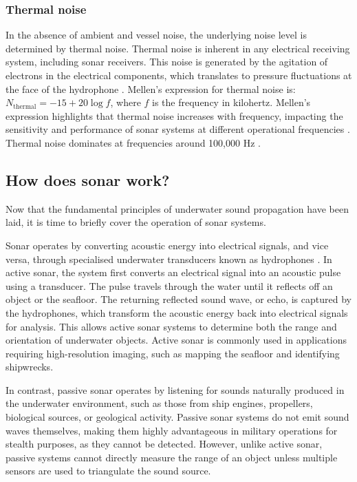 \subsubsection{Thermal noise}
    In the absence of ambient and vessel noise, the underlying noise level is determined by thermal noise. Thermal noise is inherent in any electrical receiving system, including sonar receivers. This noise is generated by the agitation of electrons in the electrical components, which translates to pressure fluctuations at the face of the hydrophone \cite{waite_sonar_2002}. Mellen's expression for thermal noise is: $N_\text{thermal} = -15 + 20 \log f$, where $f$ is the frequency in kilohertz. Mellen's expression highlights that thermal noise increases with frequency, impacting the sensitivity and performance of sonar systems at different operational frequencies \cite{bjorno_applied_2017}. Thermal noise dominates at frequencies around 100,000 Hz \cite{dahl_underwater_2007}.

\subsection{How does sonar work?}\label{subsec:sonar-working}

Now that the fundamental principles of underwater sound propagation have been laid, it is time to briefly cover the operation of sonar systems.

Sonar operates by converting acoustic energy into electrical signals, and vice versa, through specialised underwater transducers known as hydrophones \cite{waite_sonar_2002, rodriguez_fundamentals_2023, abraham_underwater_2019}. In active sonar, the system first converts an electrical signal into an acoustic pulse using a transducer. The pulse travels through the water until it reflects off an object or the seafloor. The returning reflected sound wave, or echo, is captured by the hydrophones, which transform the acoustic energy back into electrical signals for analysis. This allows active sonar systems to determine both the range and orientation of underwater objects. Active sonar is commonly used in applications requiring high-resolution imaging, such as mapping the seafloor and identifying shipwrecks.

In contrast, passive sonar operates by listening for sounds naturally produced in the underwater environment, such as those from ship engines, propellers, biological sources, or geological activity. Passive sonar systems do not emit sound waves themselves, making them highly advantageous in military operations for stealth purposes, as they cannot be detected. However, unlike active sonar, passive systems cannot directly measure the range of an object unless multiple sensors are used to triangulate the sound source.

